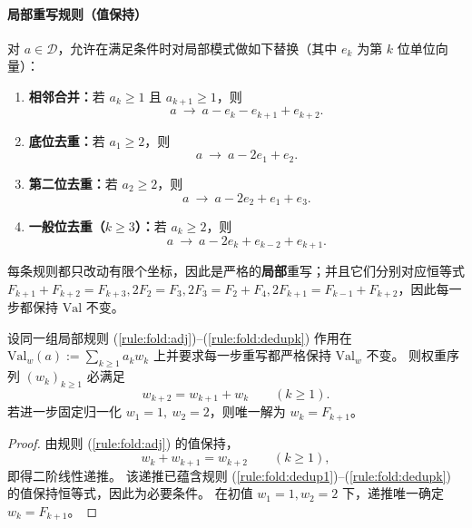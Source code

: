 \paragraph{局部重写规则（值保持）}
对 $a\in\mathcal{D}$，允许在满足条件时对局部模式做如下替换（其中 $e_k$ 为第 $k$ 位单位向量）：
\begin{enumerate}
  \renewcommand{\theenumi}{R\arabic{enumi}}
  \renewcommand{\labelenumi}{(\theenumi)}
  \item \label{rule:fold:adj}\textbf{相邻合并：}若 $a_k\ge 1$ 且 $a_{k+1}\ge 1$，则
  \[
  a\ \to\ a-e_k-e_{k+1}+e_{k+2}.
  \]
  \item \label{rule:fold:dedup1}\textbf{底位去重：}若 $a_1\ge 2$，则
  \[
  a\ \to\ a-2e_1+e_2.
  \]
  \item \label{rule:fold:dedup2}\textbf{第二位去重：}若 $a_2\ge 2$，则
  \[
  a\ \to\ a-2e_2+e_1+e_3.
  \]
  \item \label{rule:fold:dedupk}\textbf{一般位去重（$k\ge 3$）：}若 $a_k\ge 2$，则
  \[
  a\ \to\ a-2e_k+e_{k-2}+e_{k+1}.
  \]
\end{enumerate}
每条规则都只改动有限个坐标，因此是严格的\textbf{局部}重写；并且它们分别对应恒等式
\(
F_{k+1}+F_{k+2}=F_{k+3},
2F_2=F_3,
2F_3=F_2+F_4,
2F_{k+1}=F_{k-1}+F_{k+2}
\)，因此每一步都保持 $\mathrm{Val}$ 不变。

\begin{lemma}[二元局部归一化的权重递推刚性]\label{lem:fold-local-weight-rigidity-fibonacci}
设同一组局部规则 \textup{(\ref{rule:fold:adj})--(\ref{rule:fold:dedupk})} 作用在
\(
\mathrm{Val}_w(a):=\sum_{k\ge 1}a_k w_k
\)
上并要求每一步重写都严格保持 \(\mathrm{Val}_w\) 不变。
则权重序列 \((w_k)_{k\ge 1}\) 必满足
\[
w_{k+2}=w_{k+1}+w_k\qquad(k\ge 1).
\]
若进一步固定归一化 \(w_1=1,\ w_2=2\)，则唯一解为 \(w_k=F_{k+1}\)。
\end{lemma}

\begin{proof}
由规则 \textup{(\ref{rule:fold:adj})} 的值保持，
\[
w_k+w_{k+1}=w_{k+2}\qquad(k\ge 1),
\]
即得二阶线性递推。
该递推已蕴含规则 \textup{(\ref{rule:fold:dedup1})--(\ref{rule:fold:dedupk})} 的值保持恒等式，因此为必要条件。
在初值 \(w_1=1,w_2=2\) 下，递推唯一确定 \(w_k=F_{k+1}\)。
\end{proof}

